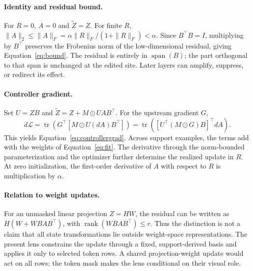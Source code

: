 \documentclass{article}
\newcommand{\tr}{\operatorname{tr}}
\begin{document}
\paragraph{Identity and residual bound.}
For $R=0$, $A=0$ and $\widetilde Z=Z$. For finite $R$, $\|A\|_2\leq\|A\|_F=\alpha\|R\|_F/(1+\|R\|_F)<\alpha$. Since $B^\top B=I$, multiplying by $B^\top$ preserves the Frobenius norm of the low-dimensional residual, giving Equation~\ref{eq:bound}. The residual is entirely in $\operatorname{span}(B)$; the part orthogonal to that span is unchanged at the edited site. Later layers can amplify, suppress, or redirect its effect.

\paragraph{Controller gradient.}
Set $U=ZB$ and $\widetilde Z=Z+M\odot UAB^\top$. For the upstream gradient $G$,
\begin{equation}
 d\mathcal L=\tr\left(G^\top[M\odot U(dA)B^\top]\right)
 =\tr\left([U^\top(M\odot G)B]^\top dA\right).
\end{equation}
This yields Equation~\ref{eq:controllergrad}. Across support examples, the terms add with the weights of Equation~\ref{eq:fit}. The derivative through the norm-bounded parameterization and the optimizer further determine the realized update in $R$. At zero initialization, the first-order derivative of $A$ with respect to $R$ is multiplication by $\alpha$.

\paragraph{Relation to weight updates.}
For an unmasked linear projection $Z=HW$, the residual can be written as $H(W+WBAB^\top)$, with $\operatorname{rank}(WBAB^\top)\leq r$. Thus the distinction is not a claim that all state transformations lie outside weight-space representations. The present lens constrains the update through a fixed, support-derived basis and applies it only to selected token rows. A shared projection-weight update would act on all rows; the token mask makes the lens conditional on their visual role.
\end{document}
